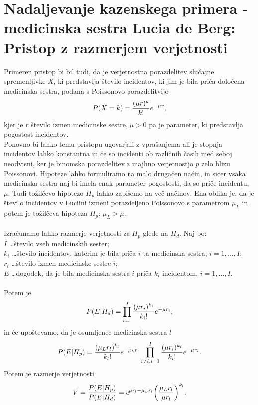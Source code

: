 \documentclass[mat1, tisk]{fmfdelo}
\theoremstyle{definition} %
\theoremstyle{trditev} %
\theoremstyle{izrek}
\begin{document}
\section{Nadaljevanje kazenskega primera - medicinska sestra Lucia de Berg: Pristop z razmerjem verjetnosti}
Primeren pristop bi bil tudi, da je verjetnostna porazdelitev slučajne spremenljivke $X$, ki predstavlja število incidentov, ki jim je bila priča 
določena medicinska sestra, podana s Poissonovo porazdelitvijo
\[
    P(X=k) = \frac{(\mu r)^{k}}{k!}e^{-\mu r}, \vspace{2mm}
\]
kjer je $r$ število izmen medicinske sestre, $\mu > 0$ pa je parameter, ki predstavlja pogostost incidentov.\\
Ponovno bi lahko temu pristopu ugovarjali z vprašanjema ali je stopnja incidentov lahko konstantna in če so incidenti ob različnih časih med seboj neodvisni, ker 
je binomska porazdelitev z majhno verjetnostjo $p$ zelo blizu Poissonovi. Hipoteze lahko formuliramo na malo drugačen način, in sicer vsaka medicinska sestra naj bi imela 
enak parameter pogostosti, da so priče incidentu, $\mu$. Tudi tožilčevo hipotezo $H_p$ lahko zapišemo na več načinov. Ena oblika je, da je število incidentov v Luciini izmeni 
porazdeljeno Poissonovo s parametrom $\mu _L$ in potem je tožilčeva hipoteza $H_p$: $\mu _L > \mu$.\\\\
Izračunamo lahko razmerje verjetnosti za $H_p$ glede na $H_d$. Naj bo:\\
$I$ \dots število vseh medicinskih sester;\\
$k_i$ \dots število incidentov, katerim je bila priča $i$-ta medicinska sestra, $i = 1, \dots , I$;\\
$r_i$ \dots število izmen medicinske sestre $i$;\\
$E$ \dots dogodek, da je bila medicinska sestra $i$ priča $k_i$ incidentom, $i = 1, \dots , I$.\\\\
Potem je
\[
    P(E \lvert H_d) = \prod_{i=1}^{I} \frac{(\mu r_i)^{k_i}}{k_i!}e^{-\mu r_i},\vspace{2mm}
\]
in če upoštevamo, da je osumljenec medicinska sestra $l$
\[
    \vspace{2mm}
    P(E \lvert H_p) = \frac{(\mu _L r_l)^{k_l}}{k_l!}e^{-\mu _L r_l}\prod_{i \neq l, i=1}^{I} \frac{(\mu r_i)^{k_i}}{k_i!}e^{-\mu r_i}.\vspace{2mm}
\]
Potem je razmerje verjetnosti
\begin{equation}\label{eq:rv}
    V = \frac{P(E \lvert H_p)}{P(E \lvert H_d)} = e^{\mu r_l-\mu _L r_l}\biggl(\frac{\mu _L r_l}{\mu r_l}\biggr)^{k_l}.\vspace{2mm}
\end{equation}
\end{document}
